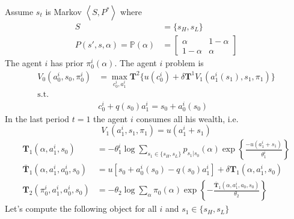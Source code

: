 \documentclass[a4paper,12pt]{article}
\begin{document}
Assume $s_t$ is Markov $\left\langle  S, P^{*} \right\rangle$ where
\begin{align*}
                 S &= \lbrace s_H, s_L \rbrace \\
P(s',s,\alpha) = \mathbb{P}(\alpha) &= \begin{bmatrix}
	\alpha	        &1-\alpha \\
	1-\alpha        &\alpha
\end{bmatrix} 
\end{align*}
The agent $i$ has prior $\pi^i_0(\alpha)$. The agent $i$ problem is
\begin{align*}
V_0(a_0^i,s_0,\pi^i_0) &= \max_{c_0^i,a_1^i} \mathbf{T}^2 \{u(c_0^i) + \delta\mathbf{T}^1 V_1(a_1^i(s_1), s_1, \pi_1) \} \\
\textrm{s.t.} & \\
              & c_0^i +  q(s_0) a_1^i = s_0 + a^i_0(s_0) 
\end{align*}
In the last period $t=1$ the agent $i$ consumes all his wealth, i.e.
\[
V_1(a_1^i, s_1, \pi_1) = u(a_1^i + s_1)
\]
\begin{align*}
\mathbf{T}_1(\alpha,a_1^i,s_0)    &= -\theta_1^i \log \sum_{s_1 \in \{s_H,s_L\}}{p_{s_1|s_0}(\alpha) \exp\left\{{\frac{-u(a_1^i + s_1)}{\theta_1^i}}\right\}} \\
\bar{\mathbf{T}}_1(\alpha,a_1^i,a_0^i,s_0)&= u\left[ s_0 + a_0^i(s_0) - q(s_0) a_1^i\right] + \delta \mathbf{T}_1(\alpha,a_1^i,s_0) \\
\mathbf{T}_2(\pi_0^i,a_1^i,a_0^i,s_0)   &=-\theta_2 \log \sum_{\alpha}{\pi_0(\alpha)\exp\left \{ -\frac{\bar{\mathbf{T}}_1(\alpha, a_1^i,a_0,s_0)}{\theta_2} \right\}}
\end{align*}
Let's compute the following object for all $i$ and $s_1 \in \{s_H,s_L\}$
\end{document}
